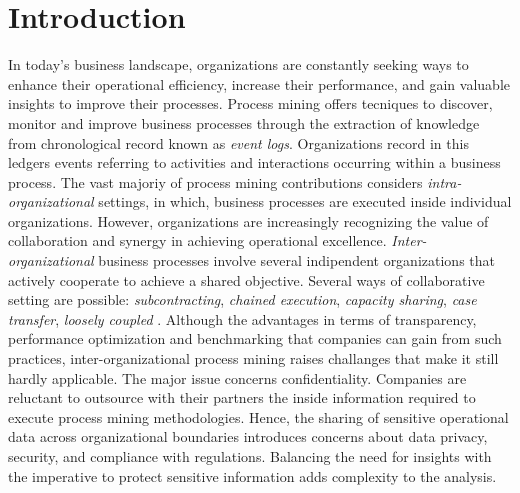 \section{Introduction}
In today's business landscape, organizations are constantly seeking ways to enhance their operational efficiency, increase their performance, and gain valuable insights to improve their processes. Process mining offers tecniques to discover, monitor and improve business processes through the extraction of knowledge from chronological record known as \textit{event logs}. Organizations record in this ledgers events referring to activities and interactions occurring within a business process. The vast majoriy of process mining contributions considers \textit{intra-organizational} settings, in which, business processes are executed inside individual organizations. However, organizations are increasingly recognizing the value of collaboration and synergy in achieving operational excellence. \textit{Inter-organizational} business processes involve several indipendent organizations that actively cooperate to achieve a shared objective. Several ways of collaborative setting are possible: \textit{subcontracting}, \textit{chained execution}, \textit{capacity sharing}, \textit{case transfer}, \textit{loosely coupled} \cite{van1999process}. Although the advantages in terms of transparency, performance optimization and benchmarking that companies can gain from such practices, inter-organizational process mining raises challanges that make it still hardly applicable. The major issue concerns confidentiality. Companies are reluctant to outsource with their partners the inside information required to execute process mining methodologies. Hence, the sharing of sensitive operational data across organizational boundaries introduces concerns about data privacy, security, and compliance with regulations. Balancing the need for insights with the imperative to protect sensitive information adds complexity to the analysis.



